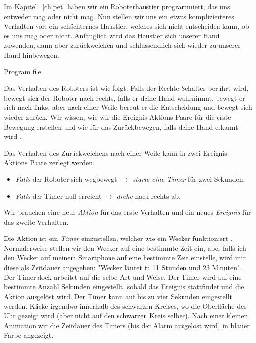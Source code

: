 
Im Kapitel ~\ref{ch.pet} haben wir ein Roboterhaustier programmiert,
das uns entweder mag oder nicht mag.
Nun stellen wir uns ein etwas komplizierteres  Verhalten vor:
ein schüchternes Haustier, welches sich nicht entscheiden kann,
ob es uns mag oder nicht. Anfänglich wird das Haustier sich unserer Hand zuwenden,
dann aber zurückweichen und schlussendlich sich wieder zu unserer Hand hinbewegen.

{\raggedleft \hfill Program file }

Das Verhalten des Roboters ist wie folgt: Falls der Rechte Schalter berührt wird, bewegt sich der Roboter nach rechts, falls er deine Hand wahrnimmt, bewegt er sich nach links, aber nach einer Weile bereut er die Entscheidung und bewegt sich wieder zurück. Wir wissen, wie wir die Ereignis-Aktions Paare für die erste Bewegung erstellen
 und wie für das Zurückbewegen, falls deine Hand erkannt wird
.

Das Verhalten des Zurückweichens nach einer Weile kann in zwei Ereignis-Aktions Paare zerlegt werden.

\begin{itemize}

\item \emph{Falls} der Roboter sich wegbewegt $\rightarrow$
\emph{starte eine Timer} für zwei Sekunden.

\item \emph{Falls} der Timer null erreicht $\rightarrow$ \emph{drehe}
nach rechts ab.

\end{itemize}

Wir brauchen eine neue \emph{Aktion} für das erste Verhalten und ein neues \emph{Ereignis} für das zweite Verhalten.

Die Aktion ist ein \emph{Timer} einzustellen, welcher wie ein Wecker funktioniert .  Normalerweise stellen wir den Wecker auf eine bestimmte Zeit ein, aber falls ich den Wecker auf meinem Smartphone auf eine bestimmte Zeit einstelle, wird mir diese als Zeitdauer angegeben: "Wecker läutet in 11 Stunden und 23 Minuten". Der Timerblock arbeitet auf die selbe Art und Weise. Der Timer wird auf eine bestimmte Anzahl Sekunden eingestellt, sobald das Ereignis stattfindet und die Aktion ausgelöst wird. Der Timer kann auf bis zu vier Sekunden eingestellt werden. Klicke irgendwo innerhalb des schwarzen Kreises, wo die Oberfläche der Uhr gezeigt wird (aber nicht auf den schwarzen Kreis selber). Nach einer kleinen Animation wir die Zeitdauer des Timers (bis der Alarm ausgelöst wird) in blauer Farbe angezeigt.

